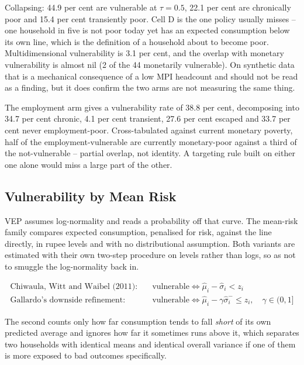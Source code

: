 \documentclass[11pt]{article}
\begin{document}
Collapsing: 44.9 per cent are vulnerable at $\tau = 0.5$, 22.1 per cent are chronically poor and
15.4 per cent transiently poor. Cell D is the one policy usually misses -- one household in five
is not poor today yet has an expected consumption below its own line, which is the definition of
a household about to become poor. Multidimensional vulnerability is 3.1 per cent, and the
overlap with monetary vulnerability is almost nil (2 of the 44 monetarily vulnerable). On
synthetic data that is a mechanical consequence of a low MPI headcount and should not be read as
a finding, but it does confirm the two arms are not measuring the same thing.

The employment arm gives a vulnerability rate of 38.8 per cent, decomposing into 34.7 per cent
chronic, 4.1 per cent transient, 27.6 per cent escaped and 33.7 per cent never
employment-poor. Cross-tabulated against current monetary poverty, half of the
employment-vulnerable are currently monetary-poor against a third of the not-vulnerable --
partial overlap, not identity. A targeting rule built on either one alone would miss a large
part of the other.

\subsection{Vulnerability by Mean Risk}\label{sec:vmr}

VEP assumes log-normality and reads a probability off that curve. The mean-risk family compares
expected consumption, penalised for risk, against the line directly, in rupee levels and with no
distributional assumption. Both variants are estimated with their own two-step procedure on
levels rather than logs, so as not to smuggle the log-normality back in.

\begin{align}
\text{Chiwaula, Witt and Waibel (2011):} \quad & \text{vulnerable} \iff \widehat{\mu}_i - \widehat{\sigma}_i < z_i \\
\text{Gallardo's downside refinement:} \quad & \text{vulnerable} \iff \widehat{\mu}_i - \gamma \widehat{\sigma}_i^{-} \leq z_i, \quad \gamma \in (0,1]
\end{align}

The second counts only how far consumption tends to fall \emph{short} of its own predicted
average and ignores how far it sometimes runs above it, which separates two households with
identical means and identical overall variance if one of them is more exposed to bad outcomes
specifically.
\end{document}
